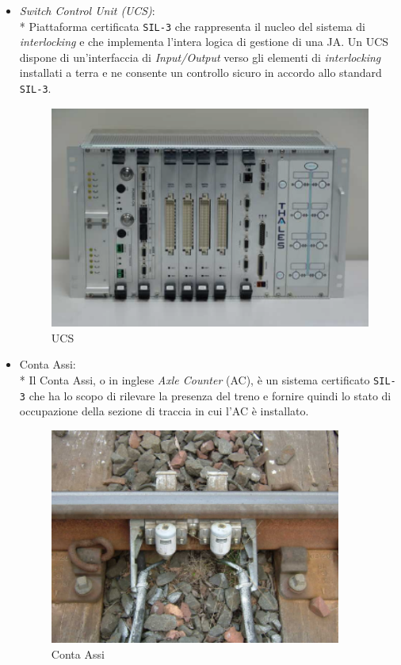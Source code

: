 \begin{itemize}
		\item \emph{Switch Control Unit (UCS)}:\\*
		Piattaforma certificata \texttt{SIL-3} \cite{sil} che rappresenta il nucleo del sistema di \emph{interlocking} e che implementa l'intera logica di gestione di una JA. Un UCS dispone di un'interfaccia di \emph{Input/Output} verso gli elementi di \emph{interlocking} installati a terra e ne consente un controllo sicuro in accordo allo standard \texttt{SIL-3}.
	\begin{figure}[h]
		\centering
				\includegraphics[width=0.7\linewidth]{img/ucs}
				\caption{UCS}
				\label{fig:ucs}
		\end{figure}\clearpage
		\item Conta Assi:\\*
		Il Conta Assi, o in inglese \emph{Axle Counter} (AC), \`e un sistema certificato \texttt{SIL-3} che ha lo scopo di rilevare la presenza del treno e fornire quindi lo stato di occupazione della sezione di traccia in cui l'AC \`e installato.
	\begin{figure}[h]
			\centering
			\includegraphics[width=0.7\linewidth,height=7.1cm]{img/axlecounter}
			\caption{Conta Assi}
			\label{fig:ac}

\end{figure}
\end{itemize}
